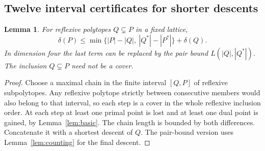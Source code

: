 \documentclass[manuscript]{aomart}
\newtheorem{lemma}[theorem]{Lemma}
\theoremstyle{definition}
\theoremstyle{remark}
\begin{document}
\subsection{Twelve interval certificates for shorter descents}\label{ssec:seedinterval}
\begin{lemma}\label{lem:seedinterval}
For reflexive polytopes $Q\subsetneq P$ in a fixed lattice,
\[
 \delta(P)\le \min\{|P|-|Q|,\ |Q^*|-|P^*|\}+\delta(Q).
\]
In dimension four the last term can be replaced by the pair bound
$L(|Q|,|Q^*|)$. The inclusion $Q\subsetneq P$ need not be a cover.
\end{lemma}
\begin{proof}
Choose a maximal chain in the finite interval $[Q,P]$ of reflexive
subpolytopes. Any reflexive polytope strictly between consecutive
members would also belong to that interval, so each step is a cover
in the whole reflexive inclusion order. At each step at least one
primal point is lost and at least one dual point is gained, by
Lemma~\ref{lem:basic}. The chain length is bounded by both differences.
Concatenate it with a shortest descent of $Q$. The pair-bound version
uses Lemma~\ref{lem:counting} for the final descent.
\end{proof}
\end{document}
